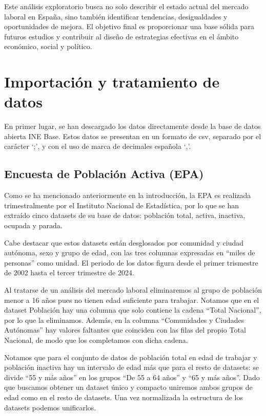 \documentclass[Universitat de
València,article,submit,moreauthors,pdftex]{Definitions/mdpi}
\begin{document}
Este análisis exploratorio busca no solo describir el estado actual del
mercado laboral en España, sino también identificar tendencias,
desigualdades y oportunidades de mejora. El objetivo final es
proporcionar una base sólida para futuros estudios y contribuir al
diseño de estrategias efectivas en el ámbito económico, social y
político.

\section{Importación y tratamiento de
datos}\label{importaciuxf3n-y-tratamiento-de-datos}

En primer lugar, se han descargado los datos directamente desde la base
de datos abierta INE Base. Estos datos se presentan en un formato de
csv, separado por el carácter `;', y con el uso de marca de decimales
española `,'.

\subsection{\texorpdfstring{\textbf{Encuesta de Población Activa
(EPA)}}{Encuesta de Población Activa (EPA)}}\label{encuesta-de-poblaciuxf3n-activa-epa}

Como se ha mencionado anteriormente en la introducción, la EPA es
realizada trimestralmente por el Instituto Nacional de Estadística, por
lo que se han extraído cinco datasets de su base de datos: población
total, activa, inactiva, ocupada y parada.

Cabe destacar que estos datasets están desglosados por comunidad y
ciudad autónoma, sexo y grupo de edad, con las tres columnas expresadas
en ``miles de personas'' como unidad. El periodo de los datos figura
desde el primer trismestre de 2002 hasta el tercer trimestre de 2024.

Al tratarse de un análisis del mercado laboral eliminaremos al grupo de
población menor a 16 años pues no tienen edad suficiente para trabajar.
Notamos que en el dataset Población hay una columna que solo contiene la
cadena ``Total Nacional'', por lo que la eliminamos. Además, en la
columna ``Comunidades y Ciudades Autónomas'' hay valores faltantes que
coinciden con las filas del propio Total Nacional, de modo que los
completamos con dicha cadena.

Notamos que para el conjunto de datos de población total en edad de
trabajar y población inactiva hay un intervalo de edad más que para el
resto de datasets: se divide ``55 y más años'' en los grupos ``De 55 a
64 años'' y ``65 y más años''. Dado que buscamos obtener un dataset
único y compacto uniremos ambos grupos de edad como en el resto de
datasets. Una vez normalizada la estructura de los datasets podemos
unificarlos.
\end{document}

